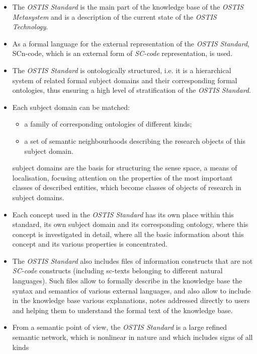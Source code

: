 \documentclass[10 pt]{extarticle}
\begin{document}
\begin{multicols}{2}
\setlength{\parskip}{3 pt}

\begin{itemize}
    \item The \textit{OSTIS Standard} is the main part of the knowledge base of the \textit{OSTIS Metasystem} and is a description of the current state of the \textit{OSTIS Technology}.
    \item \setlength{\parskip}{0pt}As a formal language for the external representation
of the \textit{OSTIS Standard}, SCn-code, which is an
external form of \textit{SC-code} representation, is used.
    \item The \textit{OSTIS Standard} is ontologically structured, i.e.
it is a hierarchical system of related formal subject
domains and their corresponding formal ontologies,
thus ensuring a high level of stratification of the
\textit{OSTIS Standard}.
    \item  Each subject domain can be matched:
        \begin{itemize}
            \item a family of corresponding ontologies of different
kinds;
            \item  a set of semantic neighbourhoods describing the
research objects of this subject domain.
        \end{itemize}
subject domains are the basis for structuring the
sense space, a means of localisation, focusing attention on the properties of the most important
classes of described entities, which become classes
of objects of research in subject domains.
    \item Each concept used in the \textit{OSTIS Standard} has its
own place within this standard, its own subject
domain and its corresponding ontology, where this
concept is investigated in detail, where all the basic information about this concept and its various
properties is concentrated.
    \item The \textit{OSTIS Standard} also includes files of information constructs that are not \textit{SC-code} constructs
(including sc-texts belonging to different natural
languages). Such files allow to formally describe
in the knowledge base the syntax and semantics
of various external languages, and also allow to
include in the knowledge base various explanations,
notes addressed directly to users and helping them
to understand the formal text of the knowledge base.
    \item From a semantic point of view, the \textit{OSTIS Standard}
is a large refined semantic network, which is nonlinear in nature and which includes signs of all kinds

\end{itemize}
\end{multicols}
\end{document}
